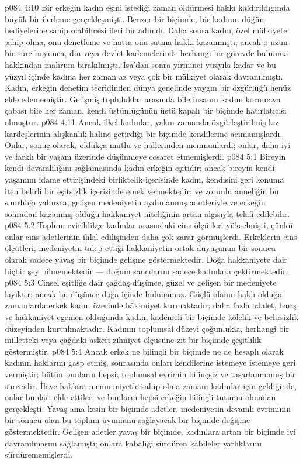 \vs p084 4:10 Bir erkeğin kadın eşini istediği zaman öldürmesi hakkı kaldırıldığında büyük bir ilerleme gerçekleşmişti. Benzer bir biçimde, bir kadının düğün hediyelerine sahip olabilmesi ileri bir adımdı. Daha sonra kadın, özel mülkiyete sahip olma, onu denetleme ve hatta onu satma hakkı kazanmıştı; ancak o uzun bir süre boyunca, din veya devlet kademelerinde herhangi bir görevde bulunma hakkından mahrum bırakılmıştı. İsa’dan sonra yirminci yüzyıla kadar ve bu yüzyıl içinde kadına her zaman az veya çok bir mülkiyet olarak davranılmıştı. Kadın, erkeğin denetim tecridinden dünya genelinde yaygın bir özgürlüğü henüz elde edememiştir. Gelişmiş topluluklar arasında bile insanın kadını korumaya çabası bile her zaman, kendi üstünlüğünün üstü kapalı bir biçimde hatırlatıcısı olmuştur.
\vs p084 4:11 Ancak ilkel kadınlar, yakın zamanda özgürleştirilmiş kız kardeşlerinin alışkanlık haline getirdiği bir biçimde kendilerine acımamışlardı. Onlar, sonuç olarak, oldukça mutlu ve hallerinden memnunlardı; onlar, daha iyi ve farklı bir yaşam üzerinde düşünmeye cesaret etmemişlerdi.
\vs p084 5:1 Bireyin kendi devamlılığını sağlamasında kadın erkeğin eşitidir; ancak bireyin kendi yaşamını idame ettirişindeki birliktelik içerisinde kadın, kendisini geri konuma iten belirli bir eşitsizlik içerisinde emek vermektedir; ve zorunlu anneliğin bu sınırlılığı yalnızca, gelişen medeniyetin aydınlanmış adetleriyle ve erkeğin sonradan kazanmış olduğu hakkaniyet niteliğinin artan algısıyla telafi edilebilir.
\vs p084 5:2 Toplum evirildikçe kadınlar arasındaki cins ölçütleri yükselmişti, çünkü onlar cins adetlerinin ihlal edilişinden daha çok zarar görmüşlerdi. Erkeklerin cins ölçütleri, medeniyetin talep ettiği hakkaniyetin ortak duyuşunun bir sonucu olarak sadece yavaş bir biçimde gelişme göstermektedir. Doğa hakkaniyete dair hiçbir şey bilmemektedir --- doğum sancılarını sadece kadınlara çektirmektedir.
\vs p084 5:3 Cinsel eşitliğe dair çağdaş düşünce, güzel ve gelişen bir medeniyete layıktır; ancak bu düşünce doğa içinde bulunamaz. Güçlü olanın haklı olduğu zamanlarda erkek kadın üzerinde hâkimiyet kurmaktadır; daha fazla adalet, barış ve hakkaniyet egemen olduğunda kadın, kademeli bir biçimde kölelik ve belirsizlik düzeyinden kurtulmaktadır. Kadının toplumsal düzeyi çoğunlukla, herhangi bir milletteki veya çağdaki askeri zihniyet ölçüsüne zıt bir biçimde çeşitlilik göstermiştir.
\vs p084 5:4 Ancak erkek ne bilinçli bir biçimde ne de hesaplı olarak kadının haklarını gasp etmiş, sonrasında onları kendilerine istemeye istemeye geri vermiştir; bütün bunların hepsi, toplumsal evrimin bilinçsiz ve tasarlanmamış bir sürecidir. İlave haklara memnuniyetle sahip olma zamanı kadınlar için geldiğinde, onlar bunları elde ettiler; ve bunların hepsi erkeğin bilinçli tutumu olmadan gerçekleşti. Yavaş ama kesin bir biçimde adetler, medeniyetin devamlı evriminin bir sonucu olan bu toplum uyumunu sağlayacak bir biçimde değişme göstermektedir. Gelişen adetler yavaş bir biçimde, kadınlara artan bir biçimde iyi davranılmasını sağlamıştı; onlara kabalığı sürdüren kabileler varlıklarını sürdürememişlerdi.
